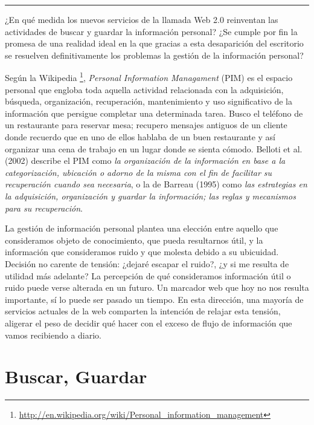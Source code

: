 \documentclass[12pt, a4paper,twoside]{book}
\begin{document}
\begin{center}\rule{3in}{0.4pt}\end{center}

¿En qué medida los nuevos servicios de la llamada Web 2.0
reinventan las actividades de buscar y guardar la información
personal? ¿Se cumple por fin la promesa de una realidad ideal en la
que gracias a esta desaparición del escritorio se resuelven
definitivamente los problemas la gestión de la información
personal?

Según la Wikipedia%
\footnote{\href{http://en.wikipedia.org/wiki/Personal_information_management}{http://en.wikipedia.org/wiki/Personal\_information\_management}},
\emph{Personal Information Managament} (PIM) es el espacio personal
que engloba toda aquella actividad relacionada con la adquisición,
búsqueda, organización, recuperación, mantenimiento y uso
significativo de la información que persigue completar una
determinada tarea. Busco el teléfono de un restaurante para
reservar mesa; recupero mensajes antiguos de un cliente donde
recuerdo que en uno de ellos hablaba de un buen restaurante y así
organizar una cena de trabajo en un lugar donde se sienta cómodo.
Belloti et al. (2002) describe el PIM como
\emph{la organización de la información en base a la categorización, ubicación o adorno de la misma con el fin de facilitar su recuperación cuando sea necesaria},
o la de Barreau (1995) como
\emph{las estrategias en la adquisición, organización y guardar la información; las reglas y mecanismos para su recuperación}.

La gestión de información personal plantea una elección entre
aquello que consideramos objeto de conocimiento, que pueda
resultarnos útil, y la información que consideramos ruido y que
molesta debido a su ubicuidad. Decisión no carente de tensión:
¿dejaré escapar el ruido?, ¿y si me resulta de utilidad más
adelante? La percepción de qué consideramos información útil o
ruido puede verse alterada en un futuro. Un marcador web que hoy no
nos resulta importante, sí lo puede ser pasado un tiempo. En esta
dirección, una mayoría de servicios actuales de la web comparten la
intención de relajar esta tensión, aligerar el peso de decidir qué
hacer con el exceso de flujo de información que vamos recibiendo a
diario.

\section{Buscar, Guardar}
\end{document}
